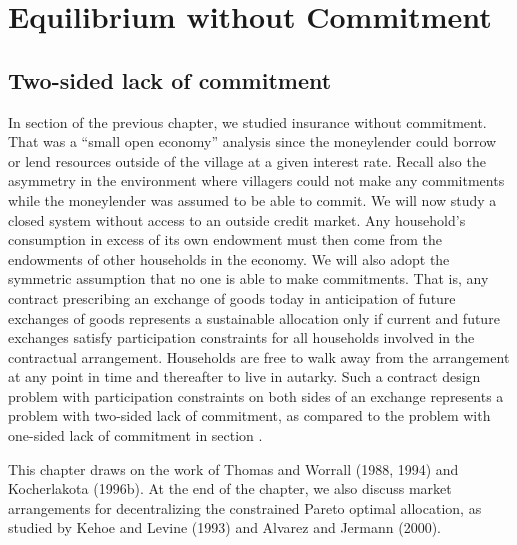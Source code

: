 

\offparens

\overfullrule=0pt

\def\bull{\vrule height .9ex width .8ex depth -.1ex}
\def\bh{\penalty-100}
\chapter{Equilibrium without Commitment \label{socialinsurance2}}

\section{Two-sided lack of commitment}
In section  of the previous chapter, we studied
insurance without commitment. That was a ``small open economy''  analysis
since the moneylender could borrow or lend resources outside
of the village at a given interest rate. Recall also the asymmetry
in the environment where villagers could not make any commitments while
the moneylender was assumed to be able to commit.
We will now study a closed system without access to an outside credit
market. Any household's consumption in excess of its own endowment
must then come from the endowments of  other households in the
economy. We will also adopt the symmetric assumption that no one
is able to make
commitments. That is, any contract prescribing an exchange of goods
today in anticipation of future exchanges of goods represents a
sustainable allocation only if current and future exchanges satisfy participation constraints
for all households involved in the contractual
arrangement. Households are free to walk away from the arrangement
at any point in time and thereafter to live in autarky. Such a contract design
problem with participation constraints on both sides of an exchange
represents a problem with two-sided lack of commitment, as compared to
the problem with one-sided lack of commitment in
section .

This chapter draws on the work of Thomas and Worrall (1988,
1994) and Kocherlakota (1996b). At the end of the chapter, we also
discuss market arrangements for decentralizing the constrained
Pareto optimal allocation, as studied by Kehoe and Levine (1993)
and Alvarez and Jermann (2000).



